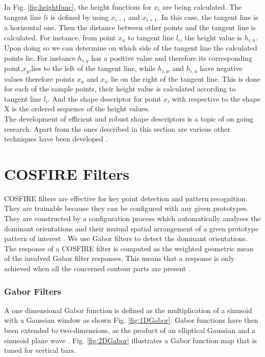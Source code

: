 In Fig. \ref{fig:heightfunc}, the height functions for $x_{i}$ are being calculated. The tangent line $l{i}$ is defined by using $x_{i-1}$ and $x_{i+1}$. In this case, the tangent line is a horizontal one. Then the distance between other points and the tangent line is calculated. For instance, from point $x_{u}$ to tangent line $l_{i}$, the height value is $h_{i,u}$. Upon doing so we can determine on which side of the tangent line the calculated points lie. For instance $h_{i,y}$ has a positive value and therefore its corresponding point,$x_{y}$,lies to the left of the tangent line, while $h_{i,w}$ and $h_{i,u}$ have negative values therefore points $x_{u}$ and $x_{w}$ lie on the right of the tangent line. This is done for each of the sample points, their height value is calculated according to tangent line $l_{i}$. And the shape descriptor for point $x_{i}$ with respective to the shape X is the ordered sequence of the height values. \\

The development of efficient and robust shape descriptors is a topic of on going research. Apart from the ones described in this section are various other techniques have been developed \cite{descriptor1,descriptor2,descriptor3,descriptor4,descriptor5}.

\section{COSFIRE Filters}
COSFIRE filters are effective for key point detection and pattern recognition. They are trainable because they can be configured with any given prototypes. They are constructed by a configuration process which automatically analyses the dominant orientations and their mutual spatial arrangement of a given prototype pattern of interest \cite{Azzopardi_Petkov_2012}. We use Gabor filters to detect the dominant orientations. The response of a COSFIRE filter is computed as the weighted geometric mean of the involved Gabor filter responses. This means that a response is only achieved when all the concerned contour parts are present \cite{Azzopardi_Petkov_2012}.

\subsubsection {Gabor Filters}
A one dimensional Gabor function is defined as the multiplication of a sinusoid with a Gaussian window as shown Fig. \ref{fig:1DGabor}. Gabor functions have then been extended to two-dimensions, as the product of an elliptical Gaussian and a sinusoid plane wave \cite{Daugman1985}. Fig. \ref{fig:2DGabor} illustrates a Gabor function map that is tuned for vertical bars.

